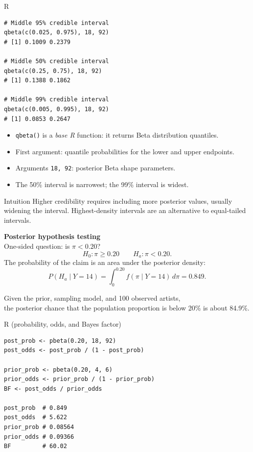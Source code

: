 \documentclass[aspectratio=43]{beamer}
\begin{document}
\begin{frame}[fragile]{R}
\begin{lstlisting}
# Middle 95% credible interval
qbeta(c(0.025, 0.975), 18, 92)
# [1] 0.1009 0.2379

# Middle 50% credible interval
qbeta(c(0.25, 0.75), 18, 92)
# [1] 0.1388 0.1862

# Middle 99% credible interval
qbeta(c(0.005, 0.995), 18, 92)
# [1] 0.0853 0.2647
\end{lstlisting}
\end{frame}

\begin{frame}{}
\begin{itemize}
\item \texttt{qbeta()} is a \emph{base R} function: it returns Beta distribution quantiles.
\item First argument: quantile probabilities for the lower and upper endpoints.
\item Arguments \texttt{18, 92}: posterior Beta shape parameters.
\item The 50\% interval is narrowest; the 99\% interval is widest.
\end{itemize}
\begin{block}{Intuition}
Higher credibility requires including more posterior values, usually widening the interval. Highest-density intervals are an alternative to equal-tailed intervals.
\end{block}
\end{frame}

\begin{frame}{\textbf{Posterior hypothesis testing}\\One-sided question: is $\pi<0.20$?}
\[
H_0:\pi\ge0.20\qquad H_a:\pi<0.20.
\]
The probability of the claim is an area under the posterior density:
\[
P(H_a\mid Y=14)=\int_0^{0.20}f(\pi\mid Y=14)\,d\pi
=0.849.
\]
\begin{block}{}
Given the prior, sampling model, and 100 observed artists,\\the posterior chance that the population proportion is below 20\% is about 84.9\%.
\end{block}
\end{frame}

\begin{frame}[fragile]{R (probability, odds, and Bayes factor)}
\begin{lstlisting}
post_prob <- pbeta(0.20, 18, 92)
post_odds <- post_prob / (1 - post_prob)

prior_prob <- pbeta(0.20, 4, 6)
prior_odds <- prior_prob / (1 - prior_prob)
BF <- post_odds / prior_odds

post_prob  # 0.849
post_odds  # 5.622
prior_prob # 0.08564
prior_odds # 0.09366
BF         # 60.02
\end{lstlisting}
\end{frame}
\end{document}

